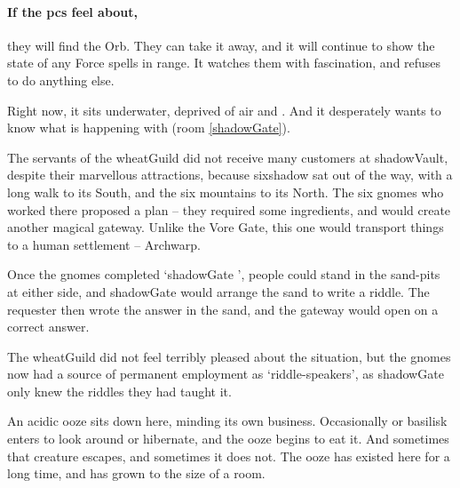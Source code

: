 \begin{multicols}{2}
\showStdSpells[
  \setcounter{enc}{2}
  \findGatewaySpell
]

\paragraph{If the \glspl{pc} feel about,}
they will find the Orb.
They can take it away, and it will continue to show the state of any Force spells in range.
It watches them with fascination, and refuses to do anything else.

Right now, it sits underwater, deprived of air and .
And it desperately wants to know what is happening with  (room \vref{shadowGate}).



\begin{exampletext}
  The servants of the \gls{wheatGuild} did not receive many customers at \gls{shadowVault}, despite their marvellous attractions, because \gls{sixshadow} sat out of the way, with a long walk to its South, and the six mountains to its North.
  The six gnomes who worked there proposed a plan -- they required some \glspl{ingredient}, and would create another magical gateway.
  Unlike the Vore Gate, this one would transport things to a human settlement -- Archwarp.

  Once the gnomes completed `\gls{shadowGate} ', people could stand in the sand-pits at either side, and \gls{shadowGate}  would arrange the sand to write a riddle.
  The requester then wrote the answer in the sand, and the gateway would open on a correct answer.

  The \gls{wheatGuild} did not feel terribly pleased about the situation, but the gnomes now had a source of permanent employment as `riddle-speakers', as \gls{shadowGate} only knew the riddles they had taught it.
\end{exampletext}

An acidic ooze sits down here, minding its own business.
Occasionally  or \gls{basilisk} enters to look around or hibernate, and the ooze begins to eat it.
And sometimes that creature escapes, and sometimes it does not.
The ooze has existed here for a long time, and has grown to the size of a room.


\end{multicols}
